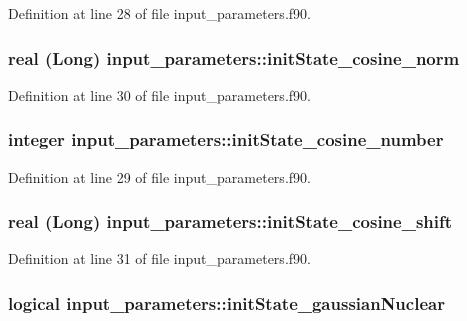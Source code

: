 Definition at line 28 of file input\_\-parameters.f90.

\hypertarget{namespaceinput__parameters_a51d2cc916f531fadef1a6f0729644174}{
\subsubsection[{initState\_\-cosine\_\-norm}]{\setlength{\rightskip}{0pt plus 5cm}real (Long) {\bf input\_\-parameters::initState\_\-cosine\_\-norm}}}
\label{namespaceinput__parameters_a51d2cc916f531fadef1a6f0729644174}


Definition at line 30 of file input\_\-parameters.f90.

\hypertarget{namespaceinput__parameters_ad5ff3d9c110be99ed08bbe970f1630c8}{
\subsubsection[{initState\_\-cosine\_\-number}]{\setlength{\rightskip}{0pt plus 5cm}integer {\bf input\_\-parameters::initState\_\-cosine\_\-number}}}
\label{namespaceinput__parameters_ad5ff3d9c110be99ed08bbe970f1630c8}


Definition at line 29 of file input\_\-parameters.f90.

\hypertarget{namespaceinput__parameters_ac3a5530df841dc82b4819f34f1e44980}{
\subsubsection[{initState\_\-cosine\_\-shift}]{\setlength{\rightskip}{0pt plus 5cm}real (Long) {\bf input\_\-parameters::initState\_\-cosine\_\-shift}}}
\label{namespaceinput__parameters_ac3a5530df841dc82b4819f34f1e44980}


Definition at line 31 of file input\_\-parameters.f90.

\hypertarget{namespaceinput__parameters_add8bfc502078fcdca67fff41e00114f7}{
\subsubsection[{initState\_\-gaussianNuclear}]{\setlength{\rightskip}{0pt plus 5cm}logical {\bf input\_\-parameters::initState\_\-gaussianNuclear}}}
\label{namespaceinput__parameters_add8bfc502078fcdca67fff41e00114f7}


